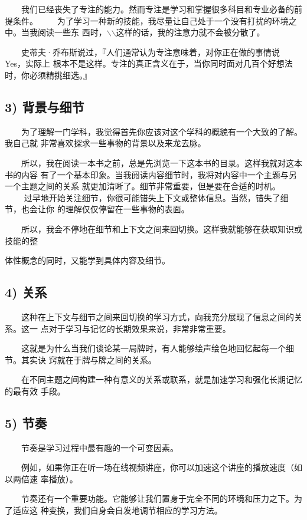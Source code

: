 \documentclass[11pt]{ctexart}
\begin{document}
{{{{　　我们已经丧失了专注的能力。然而专注是学习和掌握很多科目和专业必备的前提条件。
　　为了学习一种新的技能，我尽量让自己处于一个没有打扰的环境之中。当我阅读一些东
西时，$\backslash$$\backslash$\，这样的话，我的注意力就不会被分散了。

　　史蒂夫·乔布斯说过，『人们通常认为专注意味着，对你正在做的事情说 Yes，实际上
根本不是这样。专注的真正含义在于，当你同时面对几百个好想法时，你必须精挑细选。』

\subsection{3) 背景与细节}
\label{sec:org8abb7ab}
　　为了理解一门学科，我觉得首先你应该对这个学科的概貌有一个大致的了解。我自己就
非常喜欢探求一些事物的背景以及来龙去脉。

　　所以，我在阅读一本书之前，总是先浏览一下这本书的目录。这样我就对这本书的内容
有了一个基本印象。当我阅读内容细节时，我将对内容中一个主题与另一个主题之间的关系
就更加清晰了。细节非常重要，但是要在合适的时机。
　　
过早地开始关注细节，你很可能错失上下文或整体信息。当然，错失了细节，也会让你
的理解仅仅停留在一些事物的表面。

　　所以，我会不停地在细节和上下文之间来回切换。这样我就能够在获取知识或技能的整

体性概念的同时，又能学到具体内容及细节。

\subsection{4) 关系}
\label{sec:org6de3955}
　　这种在上下文与细节之间来回切换的学习方式，向我充分展现了信息之间的关系。这一
点对于学习与记忆的长期效果来说，非常非常重要。

　　这就是为什么当我们谈论某一局牌时，有人能够绘声绘色地回忆起每一个细节。其实诀
窍就在于牌与牌之间的关系。

　　在不同主题之间构建一种有意义的关系或联系，就是加速学习和强化长期记忆的最有效
手段。

\subsection{5) 节奏}
\label{sec:org462dcad}
　　节奏是学习过程中最有趣的一个可变因素。

　　例如，如果你正在听一场在线视频讲座，你可以加速这个讲座的播放速度（如以两倍速
率播放）。

　　节奏还有一个重要功能。它能够让我们置身于完全不同的环境和压力之下。为了适应这
种变换，我们自身会自发地调节相应的学习方法。

}}}}
\end{document}
